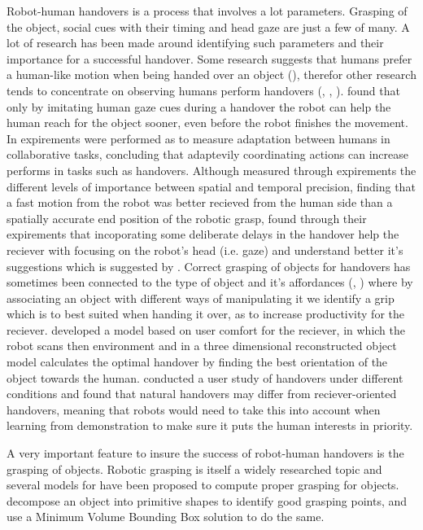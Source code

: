 Robot-human handovers is a process that involves a lot parameters. Grasping of the object, social cues with their timing and head gaze are just a few of many. A lot of research has been made around identifying such parameters and their importance for a successful handover. Some research suggests that humans prefer a human-like motion when being handed over an object (\parencite{}), therefor other research tends to concentrate on observing humans perform handovers (\parencite{Moon2014}, \parencite{Huang2015}, \parencite{Admoni2014}). \textcite{Moon2014} found that only by imitating human gaze cues during a handover the robot can help the human reach for the object sooner, even before the robot finishes the movement. In \parencite{Huang2015} expirements were performed as to measure adaptation between humans in collaborative tasks, concluding that adaptevily coordinating actions can increase performs in tasks such as handovers. Although \textcite{Koene2014} measured through expirements the different levels of importance between spatial and temporal precision, finding that a fast motion from the robot was better recieved from the human side than a spatially accurate end position of the robotic grasp, \textcite{Admoni2014} found through their expirements that incoporating some deliberate delays in the handover help the reciever with focusing on the robot's head (i.e. gaze) and understand better it's suggestions which is suggested by \parencite{Moon2014}. Correct grasping of objects for handovers has sometimes been connected to the type of object and it's affordances (\parencite{Song2015}, \parencite{Chan2014}) where by associating an object with different ways of manipulating it we identify a grip which is to best suited when handing it over, as to increase productivity for the reciever. \textcite{Aleotti2012} developed a model based on user comfort for the reciever, in which the robot scans then environment and in a three dimensional reconstructed object model calculates the optimal handover by finding the best orientation of the object towards the human. \textcite{Chan2015} conducted a user study of handovers under different conditions and found that natural handovers may differ from reciever-oriented handovers, meaning that robots would need to take this into account when learning from demonstration to make sure it puts the human interests in priority.

A very important feature to insure the success of robot-human handovers is the grasping of objects. Robotic grasping is itself a widely researched topic and several models for have been proposed to compute proper grasping for objects. \textcite{Miller2003} decompose an object into primitive shapes to identify good grasping points, and \textcite{Huebner2008} use a Minimum Volume Bounding Box solution to do the same.

